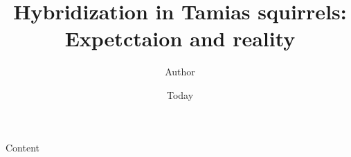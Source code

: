 \documentclass[]{article}
\begin{document}
\title{Hybridization in Tamias squirrels: Expetctaion and reality }
\author{Author}
\date{Today}
\maketitle

Content
\end{document}
